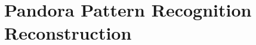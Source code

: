 \chapter{Pandora Pattern Recognition Reconstruction}

\ifpdf
    \graphicspath{{Chapter6/Figs/Raster/}{Chapter6/Figs/PDF/}{Chapter6/Figs/}}
\else
    \graphicspath{{Chapter6/Figs/Vector/}{Chapter6/Figs/}}
\fi


